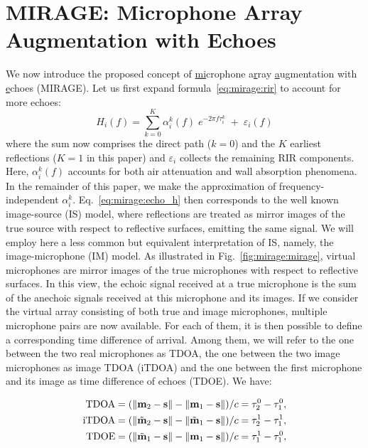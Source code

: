 \section{MIRAGE: Microphone Array Augmentation with Echoes}\label{sec:mirage:mirage}
We now introduce the proposed concept of \underline{mi}crophone a\underline{r}ray
\underline{a}u\underline{g}mentation with \underline{e}choes (MIRAGE).
Let us first expand formula~\eqref{eq:mirage:rir} to account for more echoes:
\begin{equation}
\label{eq:mirage:echo_h}
H_i(f) = \sum_{k=0}^{K}\alpha_i^k(f) \; e^{- 2 \pi f \tau_i^k} \; + \; \varepsilon_i(f)
\end{equation}
where the sum now comprises the direct path ($k=0$) and the $K$ earliest reflections ($K = 1$ in this paper)
and $\varepsilon_i$ collects the remaining RIR components.
Here, $\alpha_i^k(f)$ accounts for both air attenuation and wall absorption phenomena.
In the remainder of this paper, we make the approximation of frequency-independent $\alpha_i^k$.
Eq.~\cref{eq:mirage:echo_h} then corresponds to the well known image-source (IS) model,
where reflections are treated as mirror images of the true source with respect to reflective surfaces,
emitting the same signal.
We will employ here a less common but equivalent interpretation of IS,
namely, the image-microphone (IM) model. As illustrated in Fig.~\cref{fig:mirage:mirage},
virtual microphones are mirror images of the true microphones with respect to reflective surfaces.
In this view, the echoic signal received at a true microphone
is the sum of the anechoic signals received at this microphone and its images.
If we consider the virtual array consisting of both true and image microphones,
multiple microphone pairs are now available. For each of them,
it is then possible to define a corresponding time difference of arrival.
Among them, we will refer to the one between the two real microphones as TDOA,
the one between the two image microphones as image TDOA (iTDOA) and the one between
the first microphone and its image as time difference of echoes (TDOE).
We have:

\begin{align}
\text{TDOA} &= (\norm{\mathbf{m}_2 - \mathbf{s}}
                - \norm{\mathbf{m}_1 - \mathbf{s}})/c
                = \tau_2^0 - \tau_1^0,\\
\text{iTDOA}&= (\norm{\tilde{\mathbf{m}}_2 - \mathbf{s}}
                - \norm{\tilde{\mathbf{m}}_1 - \mathbf{s}})/c
                = \tau_2^1 - \tau_1^1,\\
\text{TDOE} &= (\norm{\tilde{\mathbf{m}}_1 - \mathbf{s}}
                - \norm{\mathbf{m}_1 - \mathbf{s}})/c
                = \tau_1^1 - \tau_1^0,
\end{align}

